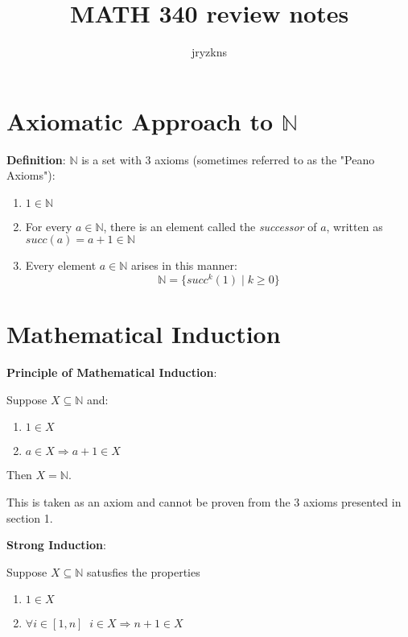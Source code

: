 \documentclass{article}
\title{MATH 340 review notes}
\author{jryzkns}
\date{}
\begin{document}
\maketitle

\begin{multicols*}{2}

\section{Axiomatic Approach to $\mathbb{N}$}

\textbf{Definition}: $\mathbb{N}$ is a set with 3 axioms (sometimes referred to as the "Peano Axioms"):

\begin{enumerate}
    \item $1 \in \mathbb{N}$
    \item For every $a \in \mathbb{N}$, there is an element called the \textit{successor} of $a$, written as $succ(a) = a+1 \in \mathbb{N}$
    \item Every element $a \in \mathbb{N}$ arises in this manner: \[\mathbb{N} = \{succ^{k}(1) \; | \; k \geq 0\}\]
\end{enumerate}

\section{Mathematical Induction}

\textbf{Principle of Mathematical Induction}: 

Suppose $X \subseteq \mathbb{N}$ and:
\begin{enumerate}
    \item $1 \in X$
    \item $a \in X \Rightarrow a+1 \in X$
\end{enumerate}
Then $X = \mathbb{N}$.

This is taken as an axiom and cannot be proven from the 3 axioms presented in section 1.

\textbf{Strong Induction}:

Suppose $X \subseteq \mathbb{N}$ satusfies the properties

\begin{enumerate}
    \item $1 \in X$
    \item $\forall i \in [1,n] \;\; i \in X \Rightarrow n+1 \in X$
    
\end{enumerate}


\end{multicols*}
\end{document}
